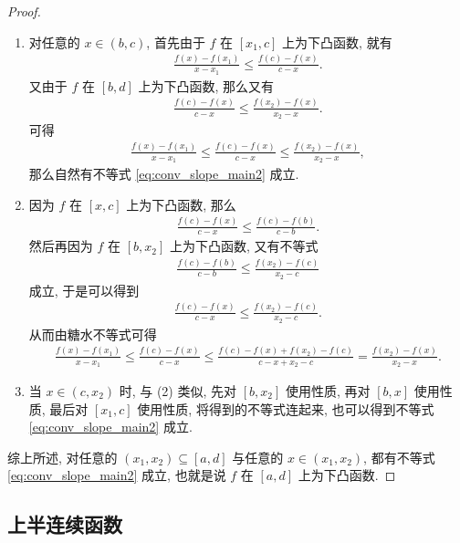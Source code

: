\documentclass[../../main.tex]{subfiles}%
\begin{document}
\begin{proof}
\begin{enumerate}[(1)]
\item 对任意的 $x \in (b,c)$, 首先由于 $f$ 在 $[x_1,c]$ 上为下凸函数, 就有
\begin{align*}
\frac{f(x)-f(x_1)}{x-x_1} \leqslant \frac{f(c)-f(x)}{c-x}.
\end{align*}
又由于 $f$ 在 $[b,d]$ 上为下凸函数, 那么又有
\begin{align*}
\frac{f(c)-f(x)}{c-x} \leqslant \frac{f(x_2)-f(x)}{x_2-x}.
\end{align*}
可得
\begin{align*}
\frac{f(x)-f(x_1)}{x-x_1} \leqslant \frac{f(c)-f(x)}{c-x} \leqslant \frac{f(x_2)-f(x)}{x_2-x},
\end{align*}
那么自然有不等式 \eqref{eq:conv_slope_main2} 成立.

\item 因为 $f$ 在 $[x,c]$ 上为下凸函数, 那么
\begin{align*}
\frac{f(c)-f(x)}{c-x} \leqslant \frac{f(c)-f(b)}{c-b}.
\end{align*}
然后再因为 $f$ 在 $[b,x_2]$ 上为下凸函数, 又有不等式
\begin{align*}
\frac{f(c)-f(b)}{c-b} \leqslant \frac{f(x_2)-f(c)}{x_2-c}
\end{align*}
成立, 于是可以得到
\begin{align*}
\frac{f(c)-f(x)}{c-x} \leqslant \frac{f(x_2)-f(c)}{x_2-c}.
\end{align*}
从而由糖水不等式可得
\begin{align*}
\frac{f(x)-f(x_1)}{x-x_1} \leqslant \frac{f(c)-f(x)}{c-x} \leqslant \frac{f(c)-f(x) + f(x_2)-f(c)}{c-x + x_2 - c} = \frac{f(x_2)-f(x)}{x_2-x}.
\end{align*}

\item 当 $x \in (c,x_2)$ 时, 与 (2) 类似, 先对 $[b,x_2]$ 使用性质, 再对 $[b,x]$ 使用性质, 最后对 $[x_1,c]$ 使用性质, 将得到的不等式连起来, 也可以得到不等式 \eqref{eq:conv_slope_main2} 成立.
\end{enumerate}

综上所述, 对任意的 $(x_1,x_2) \subseteq [a,d]$ 与任意的 $x \in (x_1,x_2)$, 都有不等式 \eqref{eq:conv_slope_main2} 成立, 也就是说 $f$ 在 $[a,d]$ 上为下凸函数.
\end{proof}










\subsection{上半连续函数}
\end{document}
